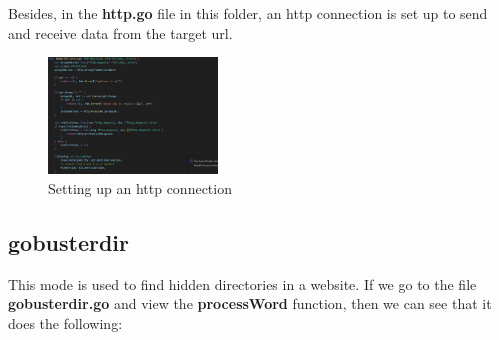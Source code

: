 \documentclass[12 pt]{article}
\begin{document}
Besides, in the \textbf{http.go} file in this folder, an http connection is set up to send and receive data from the target url.\\
\begin{figure}[!htbp]
    \centering
    \includegraphics[width=0.4\textwidth]{HTTP_Connection.png}
    \caption{Setting up an http connection}
    \label{fig: HTTP Connection}
\end{figure}
\subsection{gobusterdir}
This mode is used to find hidden directories in a website. If we go to the file \textbf{gobusterdir.go} and view the \textbf{processWord} function, then we can see that it does the following:
\end{document}
